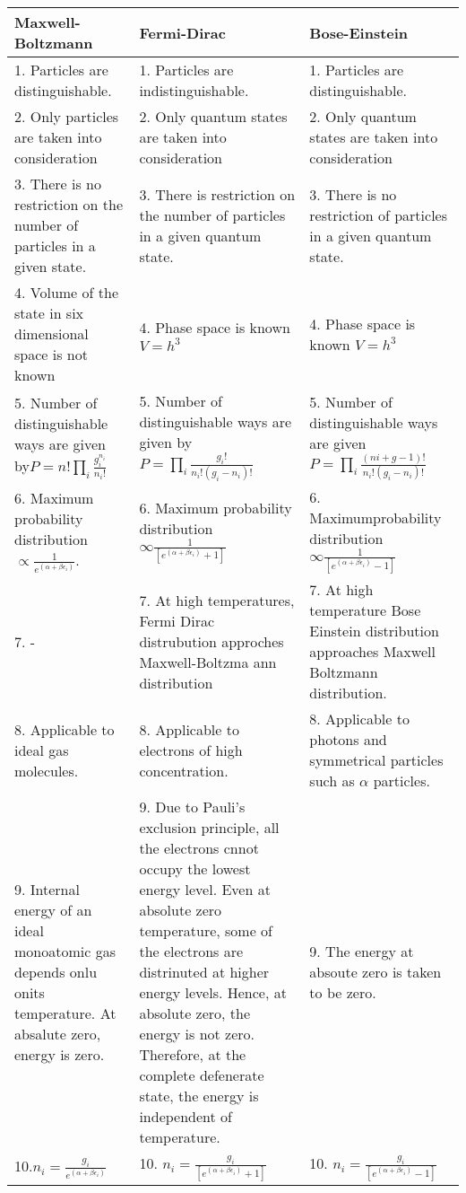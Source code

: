 \begin{tabular}{|p{5.5cm}|p{5.5cm}|p{5.5cm}|}
	\hline
\textbf{	Maxwell-Boltzmann}&\textbf{Fermi-Dirac}&\textbf{Bose-Einstein}\\\hline
	1. Particles are distinguishable.&1. Particles are indistinguishable.&1. Particles are distinguishable.\\
	2. Only particles are taken into consideration& 2. Only quantum states are taken into consideration& 2. Only quantum states are taken into consideration\\
	3. There is no restriction on the number of particles in a given state.&3. There is restriction on the number of particles in a given quantum state.&3. There is no restriction of particles in a given quantum state.\\
	4. Volume of the state in six dimensional space is not known&4. Phase space is known $V=h^3$&4. Phase space is known $V=h^3$\\
	5. Number of distinguishable ways are given by\newline$P = n!\prod_{i} \frac{g_{i}^{n_{i}}}{n_{i} !}$&5. Number of distinguishable ways are given by\newline$P=\prod_{i} \frac{g_{i} !}{n_{i}   !\left(g_{i}-n_{i}\right)!}$&5.  Number of distinguishable ways are given \newline$P=\prod_{i} \frac{(ni+g-1)!}{n_{i}   !\left(g_{i}-n_{i}\right)!}$\\
	6. Maximum probability distribution $\propto \frac{1}{e^{\left(\alpha+\beta \epsilon_{i}\right)}}$.&6. Maximum probability distribution\newline$\infty\frac{1}{\left[e^{\left(\alpha+\beta \epsilon_{i}\right)}+1\right]}$&6. Maximumprobability distribution\newline $\infty\frac{1}{\left[e^{\left(\alpha+\beta \epsilon_{i}\right)}-1\right]}$\\
	7. -&7. At high temperatures, Fermi Dirac distrubution approches Maxwell-Boltzma ann distribution&7. At high temperature Bose Einstein distribution approaches Maxwell Boltzmann distribution.\\
	8. Applicable to ideal gas molecules.&8. Applicable to electrons of high concentration.&8. Applicable to photons and symmetrical particles such as $\alpha$ particles.\\
	9. Internal energy of an ideal monoatomic gas depends onlu onits temperature. At absalute zero, energy is zero.&9. Due to Pauli's exclusion principle, all the electrons cnnot occupy the lowest energy level. Even at absolute zero temperature, some of the electrons are distrinuted at higher energy levels. Hence, at absolute zero, the energy is not zero. Therefore, at the complete defenerate state, the energy is independent of temperature.&9. The energy at absoute zero is taken to be zero. \\
	10.$n_{i}=\frac{g_{i}}{e^{\left(\alpha+\beta \epsilon_{i}\right)}}$&10. $n_{i}=\frac{g_{i}}{\left[e^{\left(\alpha+\beta \epsilon_{i}\right)}+1\right]}$&10. $n_{i}=\frac{g_{i}}{\left[e^{\left(\alpha+\beta \epsilon_{i}\right)}-1\right]}$\\\hline
\end{tabular}
